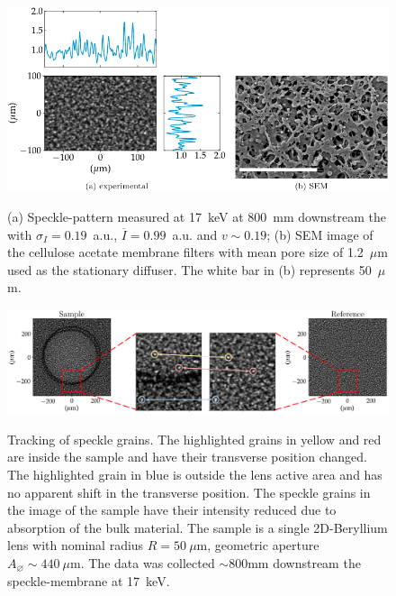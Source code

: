 \begin{refsection}
\begin{figure}[t]
        \centering
        {\includegraphics[width=0.6\linewidth]{figures/ch04/SpecklePattern.pdf}}
        \caption[Speckle-pattern and the stationary diffuser]{(a) Speckle-pattern measured at 17~keV at 800~mm downstream the with $\sigma_I=0.19$~a.u., $\overline{I}=0.99$~a.u. and $v\sim0.19$; (b) SEM image of the cellulose acetate membrane filters with mean pore size of 1.2~$\mu$m used as the stationary diffuser. The white bar in (b) represents 50~$\mu$m.} \label{fig:SpecklePattern}
\end{figure}

\begin{figure}[t]
        \centering
        {\includegraphics[width=1\linewidth]{figures/ch04/speckle_tracking.pdf}}
        \caption[Tracking of speckle grain]{Tracking of speckle grains. The highlighted grains in yellow and red are inside the sample and have their transverse position changed. The highlighted grain in blue is outside the lens active area and has no apparent shift in the transverse position. The speckle grains in the image of the sample have their intensity reduced due to absorption of the bulk material. The sample is a single 2D-Beryllium lens with nominal radius $R=50~\mu\text{m}$, geometric aperture $A_{\diameter}\sim440~\mu\text{m}$. The data was collected $\sim$800mm downstream the speckle-membrane at 17~keV.} \label{fig:speckle_tracking}
\end{figure}


\end{refsection}
